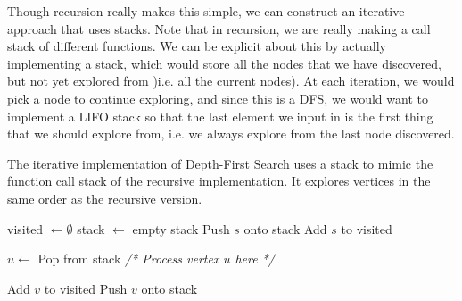   Though recursion really makes this simple, we can construct an iterative approach that uses stacks. Note that in recursion, we are really making a call stack of different functions. We can be explicit about this by actually implementing a stack, which would store all the nodes that we have discovered, but not yet explored from )i.e. all the current nodes). At each iteration, we would pick a node to continue exploring, and since this is a DFS, we would want to implement a LIFO stack so that the last element we input in is the first thing that we should explore from, i.e. we always explore from the last node discovered. 

  \begin{algo} 
    \label{algo:iterative-dfs}
    The iterative implementation of Depth-First Search uses a stack to mimic the function call stack of the recursive implementation. It explores vertices in the same order as the recursive version.
    \begin{algorithm}[H]
      \label{alg:dfs_iterative}
      \begin{algorithmic}[1]
        
          \State visited $\gets \emptyset$ 
          \State stack $\gets$ empty stack
          \State Push $s$ onto stack
          \State Add $s$ to visited
          
            \State $u \gets$ Pop from stack
            \State \textit{/* Process vertex $u$ here */}
            
                \State Add $v$ to visited
                \State Push $v$ onto stack
              \EndIf
            \EndFor
          \EndWhile
        \EndFunction
      \end{algorithmic}
    \end{algorithm}
  \end{algo}

